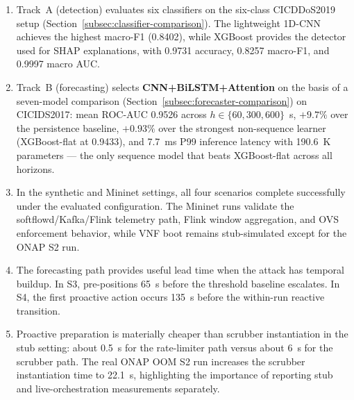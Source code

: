 \begin{enumerate}
  \item Track~A (detection) evaluates six classifiers on the six-class CICDDoS2019 setup (Section~\ref{subsec:classifier-comparison}). The lightweight 1D-CNN achieves the highest macro-F1 (0.8402), while XGBoost provides the detector used for SHAP explanations, with 0.9731 accuracy, 0.8257 macro-F1, and 0.9997 macro AUC.

  \item Track~B (forecasting) selects \textbf{CNN+BiLSTM+Attention} on the basis of a seven-model comparison (Section~\ref{subsec:forecaster-comparison}) on CICIDS2017: mean ROC-AUC 0.9526 across $h\!\in\!\{60,300,600\}$~s, $+9.7\%$ over the persistence baseline, $+0.93\%$ over the strongest non-sequence learner (XGBoost-flat at 0.9433), and 7.7~ms P99 inference latency with 190.6~K parameters --- the only sequence model that beats XGBoost-flat across all horizons.

  \item In the synthetic and Mininet settings, all four scenarios complete successfully under the evaluated configuration. The Mininet runs validate the softflowd/Kafka/Flink telemetry path, Flink window aggregation, and OVS enforcement behavior, while VNF boot remains stub-simulated except for the ONAP S2 run.

  \item The forecasting path provides useful lead time when the attack has temporal buildup. In S3, \padonap{} pre-positions  65~s before the threshold baseline escalates. In S4, the first proactive action occurs 135~s before the within-run reactive  transition.

  \item Proactive  preparation is materially cheaper than scrubber instantiation in the stub setting: about 0.5~s for the rate-limiter path versus about 6~s for the scrubber path. The real ONAP OOM S2 run increases the scrubber instantiation time to 22.1~s, highlighting the importance of reporting stub and live-orchestration measurements separately.
\end{enumerate}

